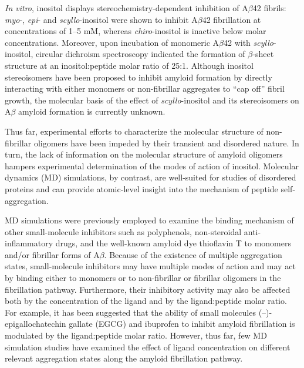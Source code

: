 \emph{In vitro}, inositol displays stereochemistry-dependent inhibition of A$\beta$42 fibrils: \emph{myo}-, \emph{epi}- and \emph{scyllo}-inositol were shown to inhibit A$\beta$42 fibrillation at concentrations of 1--5 mM,\cite{McLaurin:2000p64} whereas \emph{chiro}-inositol is inactive below molar concentrations.\cite{Janus:2000p198} Moreover, upon incubation of monomeric A$\beta$42 with \emph{scyllo}-inositol, circular dichroism spectroscopy indicated the formation of $\beta$-sheet structure at an inositol:peptide molar ratio of 25:1.\cite{McLaurin:2000p64} Although inositol stereoisomers have been proposed to inhibit amyloid formation by directly interacting with either monomers or non-fibrillar aggregates to ``cap off'' fibril growth,\cite{Janus:2000p198} the molecular basis of the effect of \emph{scyllo}-inositol and its stereoisomers on A$\beta$ amyloid formation is currently unknown.

Thus far, experimental efforts to characterize the molecular structure of non-fibrillar oligomers have been impeded by their transient and disordered nature. In turn, the lack of information on the molecular structure of amyloid oligomers hampers experimental determination of the modes of action of inositol. Molecular dynamics (MD) simulations, by contrast, are well-suited for studies of disordered proteins and can provide atomic-level insight into the mechanism of peptide self-aggregation.\cite{Nikolic:2011p185,Rauscher:2006p43,Li:2012p853,Rauscher:2010p5682,Sgourakis:2011hy,Wang:2005do,Cino:2011ff}

MD simulations were previously employed to examine the binding mechanism of other small-molecule inhibitors such as polyphenols,\cite{Lemkul:2010p23,Wang:2010p204} non-steroidal anti-inflammatory drugs\cite{Raman:2009p47,Takeda:2010p34}, and the well-known amyloid dye thioflavin T\cite{Wu:2008ds,Wu:2011fd} to monomers and/or fibrillar forms of A$\beta$\cite{Liu:2009p213}. Because of the existence of multiple aggregation states, small-molecule inhibitors may have multiple modes of action and may act by binding either to monomers\cite{Ehrnhoefer:2008fd} or to non-fibrillar or fibrillar oligomers\cite{Buell:2010p9457} in the fibrillation pathway. Furthermore, their inhibitory activity may also be affected both by the concentration of the ligand and by the ligand:peptide molar ratio. For example, it has been suggested that the ability of small molecules (--)-epigallochatechin gallate (EGCG)\cite{Wang:2010p204} and ibuprofen\cite{LeVine:2005cv} to inhibit amyloid fibrillation is modulated by the ligand:peptide molar ratio.  However, thus far, few MD simulation studies have examined the effect of ligand concentration on different relevant aggregation states along the amyloid fibrillation pathway.\cite{Wang:2010p204}

